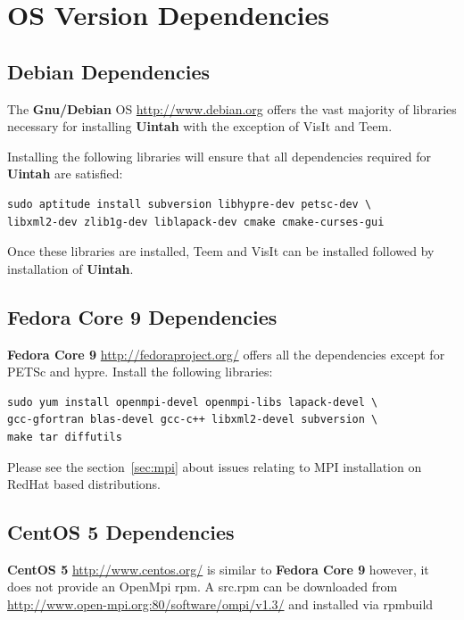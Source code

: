 \documentclass[12pt]{article}
\begin{document}
\section{OS Version Dependencies}

\subsection{Debian Dependencies}

The \textbf{Gnu/Debian} OS \url{http://www.debian.org} offers the vast majority of libraries necessary for
installing \textbf{Uintah} with the exception of VisIt and Teem.

Installing the following libraries will ensure that all dependencies
required for \textbf{Uintah} are satisfied: 

\begin{verbatim} 
sudo aptitude install subversion libhypre-dev petsc-dev \ 
libxml2-dev zlib1g-dev liblapack-dev cmake cmake-curses-gui
\end{verbatim}

Once these libraries are installed, Teem and VisIt can be installed
followed by installation of \textbf{Uintah}.

\subsection{Fedora Core 9 Dependencies}

\textbf{Fedora Core 9} \url{http://fedoraproject.org/} offers all the
dependencies except for PETSc and hypre.  Install the following
libraries:
\begin{verbatim}
sudo yum install openmpi-devel openmpi-libs lapack-devel \
gcc-gfortran blas-devel gcc-c++ libxml2-devel subversion \ 
make tar diffutils
\end{verbatim}

Please see the section~\ref{sec:mpi} about issues relating to MPI
installation on RedHat based distributions.


\subsection{CentOS 5 Dependencies}

\textbf{CentOS 5} \url{http://www.centos.org/} is similar to \textbf{Fedora
Core 9} however, it does not provide an OpenMpi rpm.  A src.rpm can be
downloaded from \url{http://www.open-mpi.org:80/software/ompi/v1.3/}
and installed via rpmbuild
\end{document}
